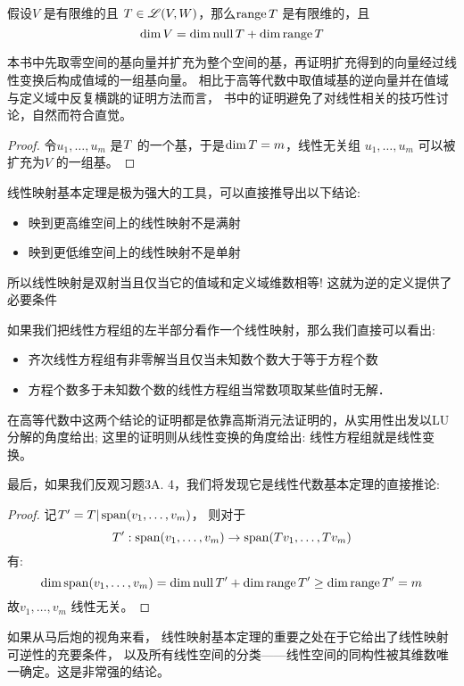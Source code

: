 \begin{theorem}
    假设\(V\) 是有限维的且 \(T \in \mathscr{L}(V,W)\)，那么\(\operatorname{range}
    T\) 是有限维的，且\[
        \dim V = \dim \operatorname{null} T + \dim \operatorname{range} T
    \]
\end{theorem}
本书中先取零空间的基向量并扩充为整个空间的基，再证明扩充得到的向量经过线性变换后构成值域的一组基向量。
相比于高等代数中取值域基的逆向量并在值域与定义域中反复横跳的证明方法而言，
书中的证明避免了对线性相关的技巧性讨论，自然而符合直觉。

\begin{proof}
    令\(u_1, \dots , u_{m}\) 是\(\null T\) 的一个基，于是\(\dim
    \null T = m\)，线性无关组 \(u_{1}, \dots ,u_{m}\) 可以被扩充为\(V\) 的一组基。
\end{proof}

线性映射基本定理是极为强大的工具，可以直接推导出以下结论:

\begin{itemize}
    \item 映到更高维空间上的线性映射不是满射
    \item 映到更低维空间上的线性映射不是单射
\end{itemize}
所以线性映射是双射当且仅当它的值域和定义域维数相等! 这就为逆的定义提供了必要条件

如果我们把线性方程组的左半部分看作一个线性映射，那么我们直接可以看出:
\begin{itemize}
    \item 齐次线性方程组有非零解当且仅当未知数个数大于等于方程个数
    \item 方程个数多于未知数个数的线性方程组当常数项取某些值时无解．
\end{itemize}

在高等代数中这两个结论的证明都是依靠高斯消元法证明的，从实用性出发以LU分解的角度给出;
这里的证明则从线性变换的角度给出: 线性方程组就是线性变换。

最后，如果我们反观习题3A. 4，我们将发现它是线性代数基本定理的直接推论:
\begin{proof}
    记\(T'= T|\operatorname{span}(v_{1}, \dots, v_{m})\)，
    则对于\[T': \operatorname{span}(v_{1}, \dots, v_{m}) \to
    \operatorname{span}(Tv_{1}, \dots, Tv_{m})\]
    有:
    \[
        \dim \operatorname{span}(v_{1}, \dots, v_{m}) = \dim
        \operatorname{null} T' +
        \dim \operatorname{range} T' \geq \dim \operatorname{range} T' = m
    \]
    故\(v_{1}, \dots, v_{m}\) 线性无关。
\end{proof}

如果从马后炮的视角来看，
线性映射基本定理的重要之处在于它给出了线性映射可逆性的充要条件，
以及所有线性空间的分类——线性空间的同构性被其维数唯一确定。这是非常强的结论。

